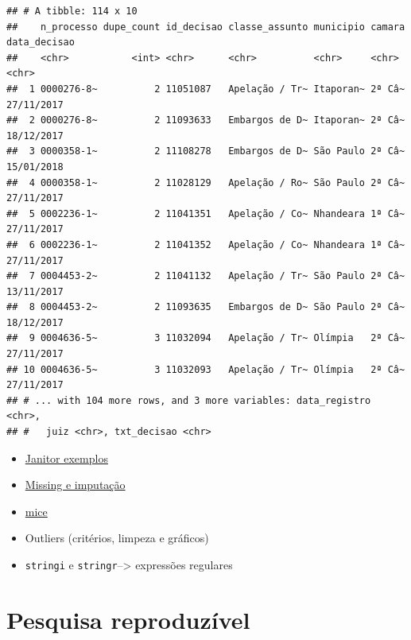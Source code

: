 \documentclass[
  9pt,
  ignorenonframetext,
]{beamer}
\begin{document}
\begin{frame}[fragile]{}
\protect\hypertarget{section-9}{}
\begin{verbatim}
## # A tibble: 114 x 10
##    n_processo dupe_count id_decisao classe_assunto municipio camara data_decisao
##    <chr>           <int> <chr>      <chr>          <chr>     <chr>  <chr>       
##  1 0000276-8~          2 11051087   Apelação / Tr~ Itaporan~ 2ª Câ~ 27/11/2017  
##  2 0000276-8~          2 11093633   Embargos de D~ Itaporan~ 2ª Câ~ 18/12/2017  
##  3 0000358-1~          2 11108278   Embargos de D~ São Paulo 2ª Câ~ 15/01/2018  
##  4 0000358-1~          2 11028129   Apelação / Ro~ São Paulo 2ª Câ~ 27/11/2017  
##  5 0002236-1~          2 11041351   Apelação / Co~ Nhandeara 1ª Câ~ 27/11/2017  
##  6 0002236-1~          2 11041352   Apelação / Co~ Nhandeara 1ª Câ~ 27/11/2017  
##  7 0004453-2~          2 11041132   Apelação / Tr~ São Paulo 2ª Câ~ 13/11/2017  
##  8 0004453-2~          2 11093635   Embargos de D~ São Paulo 2ª Câ~ 18/12/2017  
##  9 0004636-5~          3 11032094   Apelação / Tr~ Olímpia   2ª Câ~ 27/11/2017  
## 10 0004636-5~          3 11032093   Apelação / Tr~ Olímpia   2ª Câ~ 27/11/2017  
## # ... with 104 more rows, and 3 more variables: data_registro <chr>,
## #   juiz <chr>, txt_decisao <chr>
\end{verbatim}
\end{frame}

\begin{frame}[fragile]{}
\protect\hypertarget{section-10}{}
\begin{itemize}
\item
  \href{http://sfirke.github.io/janitor/articles/janitor.html}{Janitor
  exemplos}
\item
  \href{https://www.analyticsvidhya.com/blog/2016/03/tutorial-powerful-packages-imputing-missing-values/}{Missing
  e imputação}
\item
  \href{https://amices.org/mice/}{mice}
\item
  Outliers (critérios, limpeza e gráficos)
\item
  \texttt{stringi} e \texttt{stringr}--\textgreater{} expressões
  regulares
\end{itemize}
\end{frame}

\hypertarget{pesquisa-reproduzuxedvel}{%
\section{Pesquisa reproduzível}\label{pesquisa-reproduzuxedvel}}
\end{document}

